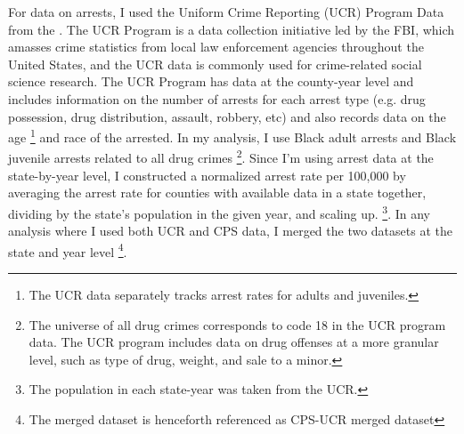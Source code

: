 \documentclass{article}
\begin{document}
For data on arrests, I used the Uniform Crime Reporting (UCR) Program Data from the \cite{ucr}. The UCR Program is a data collection initiative led by the FBI, which amasses crime statistics from local law enforcement agencies throughout the United States, and the UCR data is commonly used for crime-related social science research. The UCR Program has data at the county-year level and includes information on the number of arrests for each arrest type (e.g. drug possession, drug distribution, assault, robbery, etc) and also records data on the age \footnote{The UCR data separately tracks arrest rates for adults and juveniles.} and race of the arrested. In my analysis, I use Black adult arrests and Black juvenile arrests related to all drug crimes \footnote{The universe of all drug crimes corresponds to code 18 in the UCR program data. The UCR program includes data on drug offenses at a more granular level, such as type of drug, weight, and sale to a minor.}. Since I'm using arrest data at the state-by-year level, I constructed a normalized arrest rate per 100,000 by averaging the arrest rate for counties with available data in a state together, dividing by the state's population in the given year, and scaling up. \footnote{The population in each state-year was taken from the UCR.}. In any analysis where I used both UCR and CPS data, I merged the two datasets at the state and year level \footnote{The merged dataset is henceforth referenced as CPS-UCR merged dataset}.
\end{document}
